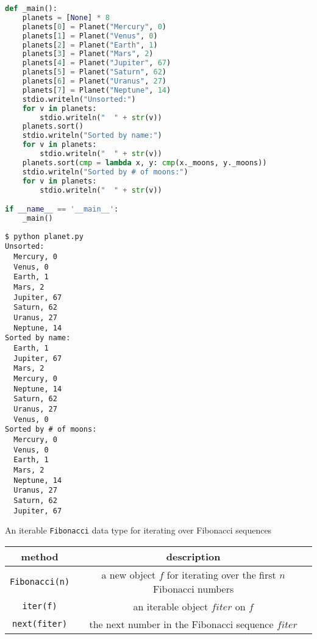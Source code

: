 \documentclass[8pt,a4paper,compress]{beamer}
\begin{document}
\begin{frame}[fragile]
\pause

\begin{lstlisting}[language=Python]
def _main():
    planets = [None] * 8
    planets[0] = Planet("Mercury", 0)
    planets[1] = Planet("Venus", 0)
    planets[2] = Planet("Earth", 1)
    planets[3] = Planet("Mars", 2)
    planets[4] = Planet("Jupiter", 67)
    planets[5] = Planet("Saturn", 62)
    planets[6] = Planet("Uranus", 27)
    planets[7] = Planet("Neptune", 14)
    stdio.writeln("Unsorted:")
    for v in planets:
        stdio.writeln("  " + str(v))
    planets.sort()
    stdio.writeln("Sorted by name:")
    for v in planets:
        stdio.writeln("  " + str(v))
    planets.sort(cmp = lambda x, y: cmp(x._moons, y._moons))
    stdio.writeln("Sorted by # of moons:")
    for v in planets:
        stdio.writeln("  " + str(v))

if __name__ == '__main__':
    _main()
\end{lstlisting}
\end{frame}

\begin{frame}[fragile]
\pause

\begin{lstlisting}[language={}]
$ python planet.py 
Unsorted:
  Mercury, 0
  Venus, 0
  Earth, 1
  Mars, 2
  Jupiter, 67
  Saturn, 62
  Uranus, 27
  Neptune, 14
Sorted by name:
  Earth, 1
  Jupiter, 67
  Mars, 2
  Mercury, 0
  Neptune, 14
  Saturn, 62
  Uranus, 27
  Venus, 0
Sorted by # of moons:
  Mercury, 0
  Venus, 0
  Earth, 1
  Mars, 2
  Neptune, 14
  Uranus, 27
  Saturn, 62
  Jupiter, 67
\end{lstlisting}
\end{frame}

\begin{frame}[fragile]
\pause

An iterable \lstinline{Fibonacci} data type for iterating over Fibonacci sequences
\begin{center}
\begin{tabular}{cc}
method & description \\ \hline
\lstinline$Fibonacci(n)$ & a new object $f$ for iterating over the first $n$ Fibonacci numbers \\
\lstinline$iter(f)$ & an iterable object $fiter$ on $f$ \\
\lstinline$next(fiter)$ & the next number in the Fibonacci sequence $fiter$
\end{tabular} 
\end{center}
\end{frame}
\end{document}
